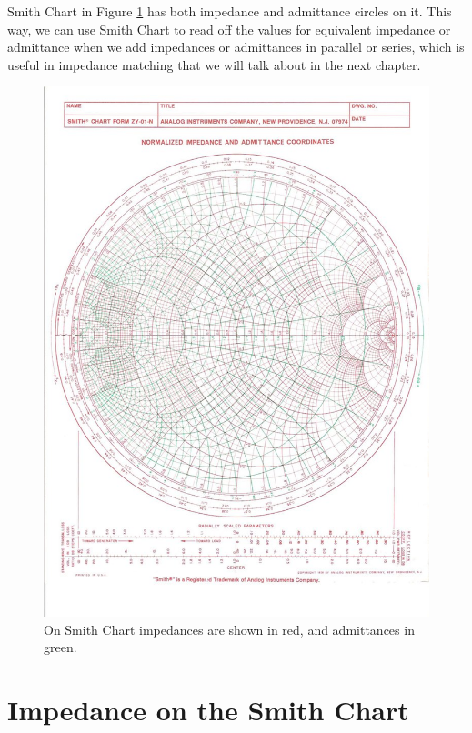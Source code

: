 \documentclass{ximera}
\begin{document}
 Smith Chart in Figure \ref{fig:SCDerscadmimp} has both impedance and admittance circles on it.  This way, we can use Smith Chart to read off the values for equivalent impedance or admittance when we add impedances or admittances in parallel or series, which is useful in impedance matching that we will talk about in the next chapter. 



\begin{figure}[htbp]
\begin{center}
\includegraphics[scale=0.3]{../jpg/SCadmimp.jpg}
\end{center}
\caption{On Smith Chart impedances are shown in red, and admittances in green.}
\label{fig:SCDerscadmimp}
\end{figure}


\section{Impedance on the Smith Chart} 
\end{document}
